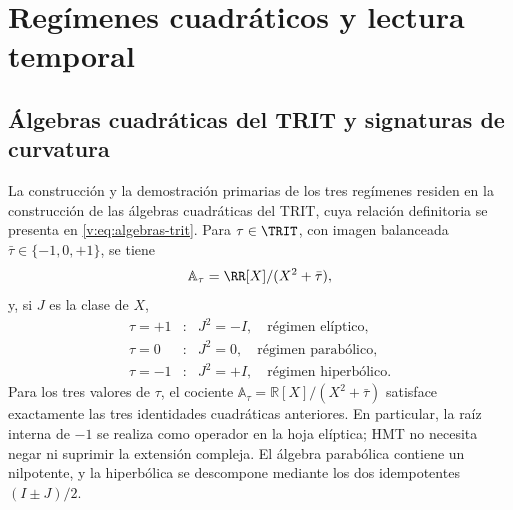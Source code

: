 \section{Regímenes cuadráticos y lectura temporal}
\label{v:v:rec:chap:regimenes-cuadraticos-tiempo}

\subsection{Álgebras cuadráticas del TRIT y signaturas de curvatura}
\label{v:v:rec:sec:regimenes-cuadraticos-recibidos}

La construcción y la demostración primarias de los tres regímenes residen en
la construcción de las álgebras cuadráticas del TRIT,
cuya relación definitoria se presenta en \eqref{v:eq:algebras-trit}. Para
\(\tau\in\TRIT\), con imagen balanceada
\(\bar\tau\in\{-1,0,+1\}\), se tiene
\[
 \mathbb A_\tau=\RR[X]/(X^2+\bar\tau),
\]
y, si \(J\) es la clase de \(X\),
\[
\begin{array}{ccl}
 \tau=+1&:&J^2=-I,\quad\text{régimen elíptico},\\
 \tau=0&:&J^2=0,\quad\text{régimen parabólico},\\
 \tau=-1&:&J^2=+I,\quad\text{régimen hiperbólico}.
\end{array}
\]
Para los tres valores de \(\tau\), el cociente
\(\mathbb A_\tau=\mathbb R[X]/(X^2+\bar\tau)\) satisface exactamente las tres
identidades cuadráticas anteriores. En particular, la raíz interna de
\(-1\) se realiza como operador en la hoja elíptica; HMT no necesita negar ni
suprimir la extensión compleja. El álgebra parabólica contiene un nilpotente,
y la hiperbólica se descompone mediante los dos idempotentes
\((I\pm J)/2\).

